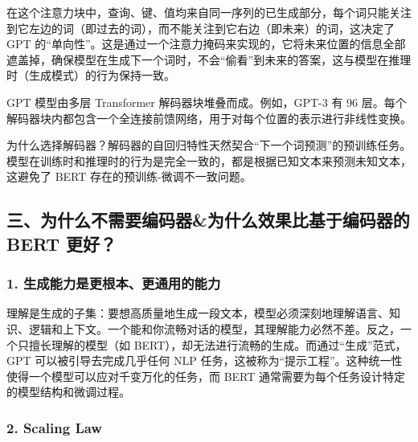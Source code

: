 在这个注意力块中，查询、键、值均来自同一序列的已生成部分，每个词只能关注到它左边的词（即过去的词），而不能关注到它右边（即未来）的词，这决定了 GPT 的``单向性''。这是通过一个注意力掩码来实现的，它将未来位置的信息全部遮盖掉，确保模型在生成下一个词时，不会``偷看''到未来的答案，这与模型在推理时（生成模式）的行为保持一致。

GPT 模型由多层 Transformer 解码器块堆叠而成。例如，GPT-3 有 96 层。每个解码器块内都包含一个全连接前馈网络，用于对每个位置的表示进行非线性变换。

为什么选择解码器？解码器的自回归特性天然契合``下一个词预测''的预训练任务。模型在训练时和推理时的行为是完全一致的，都是根据已知文本来预测未知文本，这避免了 BERT 存在的预训练-微调不一致问题。

\hypertarget{ux4e09ux4e3aux4ec0ux4e48ux4e0dux9700ux8981ux7f16ux7801ux5668ux4e3aux4ec0ux4e48ux6548ux679cux6bd4ux57faux4e8eux7f16ux7801ux5668ux7684-bert-ux66f4ux597d}{%
\subsection{三、为什么不需要编码器\&为什么效果比基于编码器的 BERT 更好？}\label{ux4e09ux4e3aux4ec0ux4e48ux4e0dux9700ux8981ux7f16ux7801ux5668ux4e3aux4ec0ux4e48ux6548ux679cux6bd4ux57faux4e8eux7f16ux7801ux5668ux7684-bert-ux66f4ux597d}}

\hypertarget{ux751fux6210ux80fdux529bux662fux66f4ux6839ux672cux66f4ux901aux7528ux7684ux80fdux529b}{%
\subsubsection{1. 生成能力是更根本、更通用的能力}\label{ux751fux6210ux80fdux529bux662fux66f4ux6839ux672cux66f4ux901aux7528ux7684ux80fdux529b}}

理解是生成的子集：要想高质量地生成一段文本，模型必须深刻地理解语言、知识、逻辑和上下文。一个能和你流畅对话的模型，其理解能力必然不差。反之，一个只擅长理解的模型（如 BERT），却无法进行流畅的生成。而通过``生成''范式，GPT 可以被引导去完成几乎任何 NLP 任务，这被称为``提示工程''。这种统一性使得一个模型可以应对千变万化的任务，而 BERT 通常需要为每个任务设计特定的模型结构和微调过程。

\hypertarget{scaling-law}{%
\subsubsection{2. Scaling Law}\label{scaling-law}}

